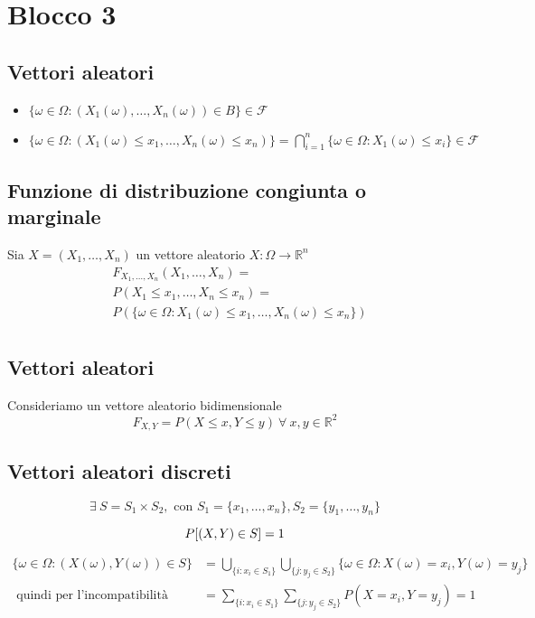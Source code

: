 \section*{Blocco 3}
\subsection*{Vettori aleatori}
\begin{itemize}
    \item $\{\omega \in \Omega : (X_1(\omega),\dots,X_n(\omega)) \in B\} \in \mathscr{F}$
    \item $\{\omega \in \Omega : (X_1(\omega) \le x_1, \dots, X_n(\omega) \le x_n)\}
        = \displaystyle \bigcap_{i=1}^{n}\{\omega \in \Omega : X_1(\omega) \le x_i\} \in \mathscr{F}$
\end{itemize}

\subsection*{Funzione di distribuzione congiunta o marginale}
Sia $X = (X_1,\dots,X_n)$ un vettore aleatorio $X: \Omega \to \mathbb{R}^n$ 
\begin{align*}
&F_{X_1,\dots,X_n}(X_1,\dots,X_n) = \\
&P(X_1 \le x_1, \dots, X_n \le x_n) = \\
&P(\{\omega \in \Omega : X_1(\omega) \le x_1, \dots, X_n(\omega) \le x_n\})\\
\end{align*}

\subsection*{Vettori aleatori}
Consideriamo un vettore aleatorio bidimensionale
$$
F_{X,Y} = P(X \le x, Y \le y) \ \forall \ x,y \in \mathbb{R}^2
$$

\subsection*{Vettori aleatori discreti}
$$
\exists \ S = S_1 \times S_2, \text{ con } S_1 = \{x_1,\dots,x_n\}, S_2 = \{y_1,\dots,y_n\}
$$

$$
P[(X,Y) \in S] = 1\\
$$

\begin{align*}
\{ \omega \in \Omega : (X(\omega), Y(\omega)) \in S\} &= 
    \bigcup_{\{i: x_i \in S_1\}}\bigcup_{\{j: y_j \in S_2\}}
    \{\omega \in \Omega : X(\omega) = x_i, Y(\omega) = y_j\}\\
\text{ quindi per l'incompatibilità } &=
    \sum_{\{i: x_i \in S_1\}}\sum_{\{j: y_j \in S_2\}}
    P(X = x_i, Y = y_j) = 1
\end{align*}

